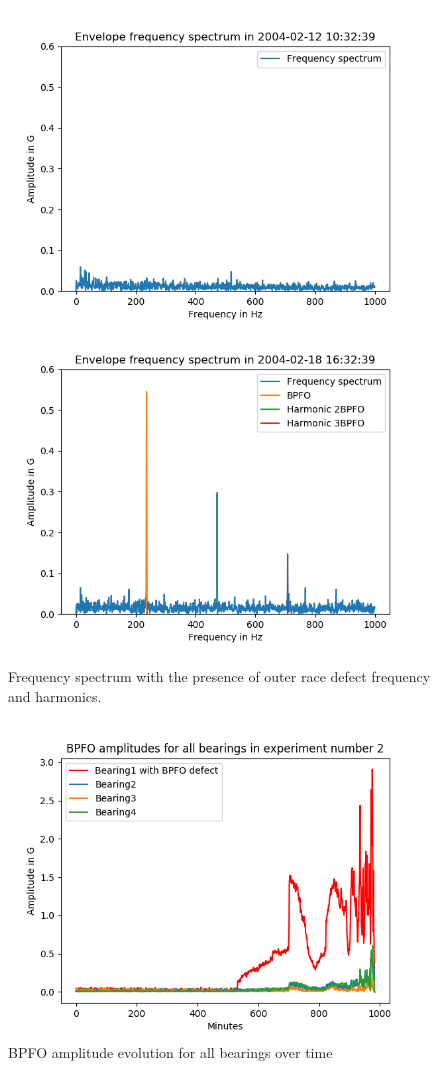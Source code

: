 \documentclass[../Main/thesis.tex]{subfiles}
\begin{document}
\begin{figure}[H]
	\centering
	\includegraphics[width=0.7\linewidth]{../fig/bpfo/first_day_spectrum_bpfo}
	\includegraphics[width=0.7\linewidth]{../fig/bpfo/last_day_spectrum_bpfo}
	\caption{Frequency spectrum with the presence of outer race defect frequency and harmonics.}
	\label{fig:bpfo}
\end{figure}

\begin{figure}[H] 
   \centering
    \includegraphics[width=4.9in]{../fig/experiment2_bearing_fft_amp.png}
   \caption{BPFO amplitude evolution for all bearings over time}
   \label{fig:experiment2_bearing_fft_amp}
\end{figure}
\clearpage
\end{document}
